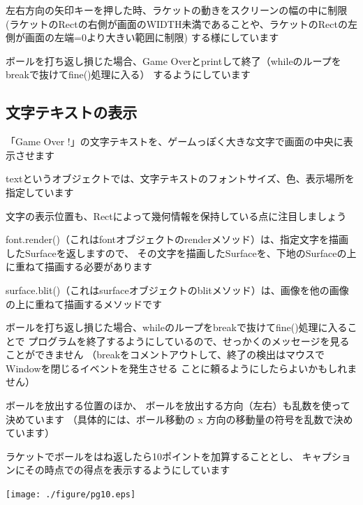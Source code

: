 \documentclass[uplatex,a4paper,11pt,oneside,openany]{jsbook}
\begin{document}
左右方向の矢印キーを押した時、ラケットの動きをスクリーンの幅の中に制限
(ラケットのRectの右側が画面のWIDTH未満であることや、ラケットのRectの左側が画面の左端=0より大きい範囲に制限)
する様にしています

\newpage



ボールを打ち返し損じた場合、Game Overとprintして終了（whileのループをbreakで抜けてfine()処理に入る）
するようにしています

\subsection{文字テキストの表示}

「Game Over !」の文字テキストを、ゲームっぽく大きな文字で画面の中央に表示させます

textというオブジェクトでは、文字テキストのフォントサイズ、色、表示場所を指定しています

文字の表示位置も、Rectによって幾何情報を保持している点に注目しましょう

font.render()（これはfontオブジェクトのrenderメソッド）は、指定文字を描画したSurfaceを返しますので、
その文字を描画したSurfaceを、下地のSurfaceの上に重ねて描画する必要があります

surface.blit()（これはsurfaceオブジェクトのblitメソッド）は、画像を他の画像の上に重ねて描画するメソッドです



ボールを打ち返し損じた場合、whileのループをbreakで抜けてfine()処理に入ることで
プログラムを終了するようにしているので、せっかくのメッセージを見ることができません
（breakをコメントアウトして、終了の検出はマウスでWindowを閉じるイベントを発生させる
ことに頼るようにしたらよいかもしれません）

ボールを放出する位置のほか、
ボールを放出する方向（左右）も乱数を使って決めています
（具体的には、ボール移動の x 方向の移動量の符号を乱数で決めています）

ラケットでボールをはね返したら10ポイントを加算することとし、
キャプションにその時点での得点を表示するようにしています

\begin{center}
\texttt{[image: ./figure/pg10.eps]}
\end{center}
\end{document}
